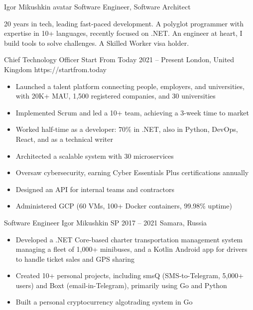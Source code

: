 \documentclass[9pt,a4paper]{juicv}
\begin{document}
\begin{paracol}{2}
\cvMakeHeader
    {Igor Mikushkin}
    {avatar}
    {Software Engineer, Software Architect}

    20 years in tech, leading fast-paced development.
    A polyglot programmer with expertise in 10+ languages, recently focused on .NET.
    An engineer at heart, I build tools to solve challenges.
    A Skilled Worker visa holder.

    \cvLeftEvent
        {Chief Technology Officer}
        {Start From Today}
        {2021 -- Present}
        {London, United Kingdom}
        {https://startfrom.today}

        \begin{itemize}
            \item Launched a talent platform connecting people, employers, and universities,
                  with 20K+ MAU, 1,500 registered companies, and 30 universities
            \item Implemented Scrum and led a 10+ team,
                  achieving a 3-week time to market
            \item Worked half-time as a developer: 70\% in .NET,
                  also in Python, DevOps, React, and as a technical writer
            \item Architected a scalable system with 30 microservices
            \item Oversaw cybersecurity, earning Cyber Essentials Plus certifications annually
            \item Designed an API for internal teams and contractors
            \item Administered GCP (60 VMs, 100+ Docker containers, 99.98\% uptime)
        \end{itemize}

    \cvLeftEvent
        {Software Engineer}
        {Igor Mikushkin SP}
        {2017 -- 2021}
        {Samara, Russia}
        {}

        \begin{itemize}
            \item Developed a .NET Core-based charter transportation management system
                  managing a fleet of 1,000+ minibuses,
                  and a Kotlin Android app for drivers to handle ticket sales and GPS sharing
            \item Created 10+ personal projects,
                  including smsQ (SMS-to-Telegram, 5,000+ users)
                  and Boxt (email-in-Telegram), primarily using Go and Python
            \item Built a personal cryptocurrency algotrading system in Go
        \end{itemize}


\end{paracol}
\end{document}
